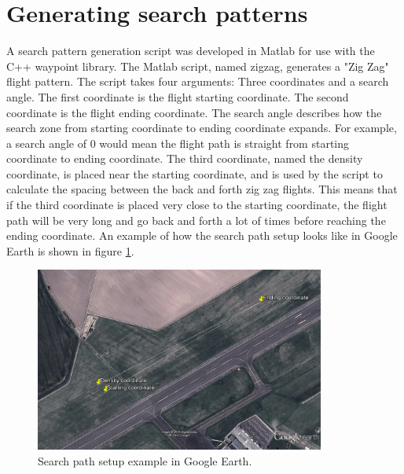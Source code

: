 \section{Generating search patterns}
A search pattern generation script was developed in Matlab for use with the C++ waypoint library.
The Matlab script, named zigzag, generates a "Zig Zag" flight pattern.
The script takes four arguments: Three coordinates and a search angle.
The first coordinate is the flight starting coordinate. The second coordinate is the flight ending coordinate.
The search angle describes how the search zone from starting coordinate to ending coordinate expands.
For example, a search angle of 0 would mean the flight path is straight from starting coordinate to ending coordinate.
The third coordinate, named the density coordinate, is placed near the starting coordinate, and is used by the script to calculate the spacing
between the back and forth zig zag flights. This means that if the third coordinate is placed very close to the starting coordinate,
the flight path will be very long and go back and forth a lot of times before reaching the ending coordinate.
An example of how the search path setup looks like in Google Earth is shown in figure \ref{fig:googlepath}.
\begin{figure}[ht]
\centering
\includegraphics[width=0.85\textwidth]{Images/googlepath}
\caption[Search path setup.]{Search path setup example in Google Earth.}
\label{fig:googlepath}
\end{figure}


\newpage